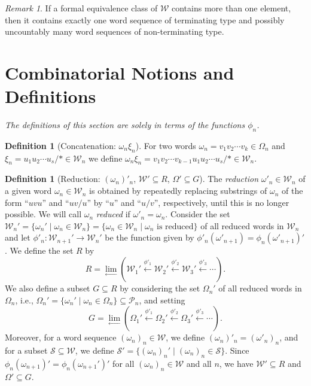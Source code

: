 \documentclass{amsart}
\theoremstyle{definition}
\newtheorem{definition}[theorem]{Definition}
\theoremstyle{remark}
\newtheorem{remark}[theorem]{Remark}
\numberwithin{equation}{section}
\begin{document}
\begin{remark}\label{classes}
If a formal equivalence class of $\mathcal W$ contains more than one element, then it contains exactly one word sequence of terminating type and possibly uncountably many word sequences of non-terminating type.
\end{remark}

\section{Combinatorial Notions and Definitions} \label{combinatorics}

{\sl The definitions of this section are solely in terms of the functions $\phi_n$.}

\begin{definition}[Concatenation: $\omega_n\xi_n$]
For two words $\omega_n=v_1v_2\cdots v_k\in \Omega_n$ and\linebreak $\xi_n=u_1u_2\cdots u_s/\ast \in {\mathcal W}_n$ we define $\omega_n\xi_n=v_1v_2\cdots v_{k-1}u_1u_2\cdots u_s/\ast\in {\mathcal W}_n$.
\end{definition}

\begin{definition}[Reduction: $(\omega_n)'_n$, ${\mathcal W}'\subseteq R$, $\Omega'\subseteq G$]\label{prime}
The {\em reduction} $\omega'_n\in {\mathcal W}_n$ of a given word  $\omega_n\in {\mathcal W}_n$ is obtained by repeatedly replacing substrings of $\omega_n$ of the form ``$uvu$'' and ``$uv/u$'' by ``$u$'' and ``$u/v$'', respectively, until this is no longer possible.  We will call $\omega_n$ {\em  reduced} if $\omega'_n=\omega_n$. Consider the set ${\mathcal W}_n'=\{\omega_n'\mid \omega_n\in {\mathcal W}_n\}=\{\omega_n\in {\mathcal W}_n \mid \omega_n \mbox{ is reduced}\}$ of all reduced words in ${\mathcal W}_n$
 and let $\phi'_n:{\mathcal W}_{n+1}'\rightarrow {\mathcal W}_n'$ be the function given by $\phi'_n(\omega'_{n+1})=\phi_n(\omega'_{n+1})'$. We define the set $R$ by  \[R=\lim_{\longleftarrow} \left({\mathcal W}_1'\stackrel{\phi'_1}{\longleftarrow}  {\mathcal W}_2'\stackrel{\phi'_2}{\longleftarrow} {\mathcal W}_3'\stackrel{\phi'_3}{\longleftarrow}\cdots \right).\] We also define a subset $G\subseteq R$ by considering the set $\Omega_n'$ of all reduced words in~$\Omega_n$, i.e., $\Omega_n'=\{\omega_n'\mid \omega_n\in \Omega_n\}\subseteq {\mathcal P}_n$, and setting \[ G=\lim_{\longleftarrow} \left(\Omega_1'\stackrel{\phi'_1}{\longleftarrow} \Omega_2'\stackrel{\phi'_2}{\longleftarrow} \Omega_3'\stackrel{\phi'_3}{\longleftarrow}\cdots \right).\]
 Moreover, for a word sequence $(\omega_n)_n\in{\mathcal W}$, we define $(\omega_n)'_n=(\omega'_n)_n$, and  for a subset ${\mathcal S}\subseteq {\mathcal W}$, we define ${\mathcal S}'=\{(\omega_n)_n'\mid (\omega_n)_n\in {\mathcal S}\}$. Since $\phi_n(\omega_{n+1})'=\phi_n(\omega_{n+1}')'$ for all $(\omega_n)_n\in {\mathcal W}$ and all $n$, we have  ${\mathcal W}'\subseteq R $ and $\Omega'\subseteq G$.
\end{definition}
\end{document}
